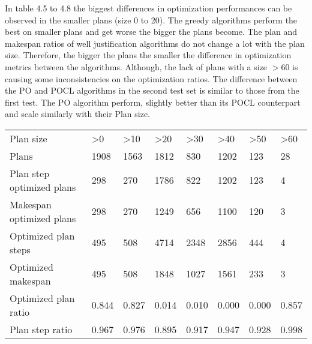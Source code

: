 In table 4.5 to 4.8 the biggest differences in optimization performances can be 
observed in the smaller plans (size 0 to 20).  
The greedy algorithms perform the best on smaller plans and get 
worse the bigger the plans become.
The plan and makespan ratios of well justification algorithms do not change a lot with the plan size.
Therefore, the bigger the plans the smaller the difference in optimization metrics between the algorithms.
Although, the lack of plans with a size $>$60 is causing some inconsistencies on the optimization ratios. 
The difference between the PO and POCL algorithms in the second test set is similar to those from the
first test. The PO algorithm perform, slightly better than its POCL counterpart and 
scale similarly with their Plan size.


\begin{table}[b]
\begin{tabular}{llllllll}
\cline{1-8}
Plan size                     & \textgreater{}0 & \textgreater{}10 & \textgreater{}20 & \textgreater{}30 & \textgreater{}40 & \textgreater{}50 & \textgreater{}60 \\ \cline{1-8}
Plans                          & 1908            & 1563             & 1812             & 830              & 1202             & 123              & 28               \\
Plan step optimized plans      & 298             & 270              & 1786             & 822              & 1202             & 123              & 4                \\
Makespan optimized plans       & 298             & 270              & 1249             & 656              & 1100             & 120              & 3                \\
Optimized plan steps           & 495             & 508              & 4714             & 2348             & 2856             & 444              & 4                \\
Optimized makespan             & 495             & 508              & 1848             & 1027             & 1561             & 233              & 3                \\
Optimized plan ratio           & 0.844           & 0.827            & 0.014            & 0.010            & 0.000            & 0.000            & 0.857            \\
Plan step ratio                & 0.967           & 0.976            & 0.895            & 0.917            & 0.947            & 0.928            & 0.998            \\

\end{tabular}
\end{table}
